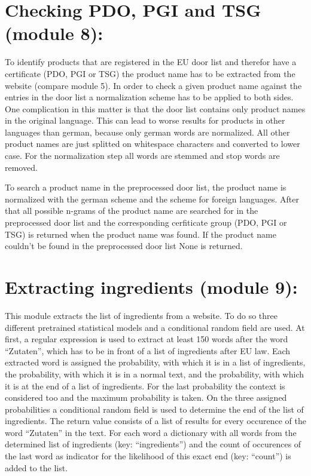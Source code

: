 \documentclass[letterpaper,10pt,english]{sphinxmanual}
\begin{document}
\section{Checking PDO, PGI and TSG (module 8):}
\label{\detokenize{modules:checking-pdo-pgi-and-tsg-module-8}}
To identify products that are registered in the EU door list and
therefor have a certificate (PDO, PGI or TSG) the product name has to
be extracted from the website (compare module 5). In order to check a
given product name against the entries in the door list a
normalization scheme has to be applied to both sides. One complication
in this matter is that the door list contains only product names in
the original language. This can lead to worse results for products in
other languages than german, because only german words are
normalized. All other product names are just splitted on whitespace
characters and converted to lower case. For the normalization step
all words are stemmed and stop words are removed.

To search a product name in the preprocessed door list, the product
name is normalized with the german scheme and the scheme for foreign
languages. After that all possible n-grams of the product name are
searched for in the preprocessed door list and the corresponding
cerfiticate group (PDO, PGI or TSG) is returned when the product name
was found. If the product name couldn’t be found in the preprocessed
door list None is returned.


\section{Extracting ingredients (module 9):}
\label{\detokenize{modules:extracting-ingredients-module-9}}
This module extracts the list of ingredients from a website. To do so
three different pretrained statistical models and a conditional random
field are used. At first, a regular expression is used to extract at
least 150 words after the word “Zutaten”, which has to be in front of
a list of ingredients after EU law. Each extracted word is assigned
the probability, with which it is in a list of ingredients, the
probability, with which it is in a normal text, and the probability,
with which it is at the end of a list of ingredients. For the last
probability the context is considered too and the maximum probability
is taken. On the three assigned probabilities a conditional random
field is used to determine the end of the list of ingredients. The
return value consists of a list of results for every occurence of the
word “Zutaten” in the text. For each word a dictionary with all words
from the determined list of ingredients (key: “ingredients”) and the
count of occurences of the last word as indicator for the likelihood
of this exact end (key: “count”) is added to the list.
\end{document}
